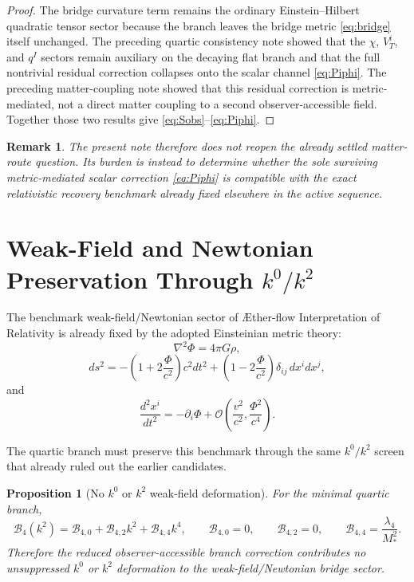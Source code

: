 \documentclass[11pt]{article}
\newcommand{\Aflow}{\AE{}ther-flow}
\newcommand{\TheoryName}{\Aflow{} Interpretation of Relativity}
\newtheorem{proposition}{Proposition}
\newtheorem{remark}{Remark}
\begin{document}
\begin{proof}
The bridge curvature term remains the ordinary Einstein--Hilbert quadratic tensor sector because the branch leaves the bridge metric \eqref{eq:bridge} itself unchanged. The preceding quartic consistency note showed that the \(\chi\), \(V_T^i\), and \(q^I\) sectors remain auxiliary on the decaying flat branch and that the full nontrivial residual correction collapses onto the scalar channel \eqref{eq:Piphi}. The preceding matter-coupling note showed that this residual correction is metric-mediated, not a direct matter coupling to a second observer-accessible field. Together those two results give \eqref{eq:Sobs}--\eqref{eq:Piphi}.
\end{proof}

\begin{remark}
The present note therefore does not reopen the already settled matter-route question. Its burden is instead to determine whether the sole surviving metric-mediated scalar correction \eqref{eq:Piphi} is compatible with the exact relativistic recovery benchmark already fixed elsewhere in the active sequence.
\end{remark}

\section{Weak-Field and Newtonian Preservation Through \texorpdfstring{$k^0/k^2$}{k0/k2}}

The benchmark weak-field/Newtonian sector of \TheoryName{} is already fixed by the adopted Einsteinian metric theory:
\begin{equation}
\nabla^2\Phi=4\pi G\rho,
\label{eq:poisson}
\end{equation}
\begin{equation}
ds^2
=
-\left(1+2\frac{\Phi}{c^2}\right)c^2dt^2
+
\left(1-2\frac{\Phi}{c^2}\right)\delta_{ij}\,dx^i dx^j,
\label{eq:weakfield}
\end{equation}
and
\begin{equation}
\frac{d^2x^i}{dt^2}
=
-\partial_i\Phi
+ \mathcal O\!\left(\frac{v^2}{c^2},\frac{\Phi^2}{c^4}\right).
\label{eq:newtonian}
\end{equation}

The quartic branch must preserve this benchmark through the same \(k^0/k^2\) screen that already ruled out the earlier candidates.

\begin{proposition}[No \(k^0\) or \(k^2\) weak-field deformation]
For the minimal quartic branch,
\begin{equation}
\mathcal B_4(k^2)
=
\mathcal B_{4,0}
+
\mathcal B_{4,2}k^2
+
\mathcal B_{4,4}k^4,
\qquad
\mathcal B_{4,0}=0,
\qquad
\mathcal B_{4,2}=0,
\qquad
\mathcal B_{4,4}=\frac{\lambda_4}{M_*^2}.
\label{eq:B4coeffs}
\end{equation}
Therefore the reduced observer-accessible branch correction contributes no unsuppressed \(k^0\) or \(k^2\) deformation to the weak-field/Newtonian bridge sector.
\end{proposition}
\end{document}

